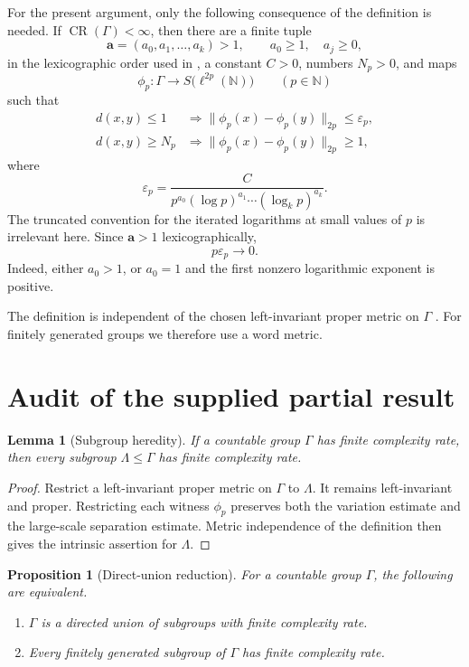 \documentclass[11pt]{article}
\newtheorem{proposition}[theorem]{Proposition}
\newtheorem{lemma}[theorem]{Lemma}
\newcommand{\CR}{\operatorname{CR}}
\newcommand{\N}{\mathbb N}
\newcommand{\eps}{\varepsilon}
\newcommand{\Sphere}{S}
\begin{document}
For the present argument, only the following consequence of the definition is needed.  If $\CR(\Gamma)<\infty$, then there are a finite tuple
\[
  \mathbf a=(a_0,a_1,\ldots,a_k)>1,
  \qquad a_0\ge 1,\quad a_j\ge 0,
\]
in the lexicographic order used in \cite{TianYu2026}, a constant $C>0$, numbers $N_p>0$, and maps
\[
  \phi_p:\Gamma\longrightarrow \Sphere\bigl(\ell^{2p}(\N)\bigr)
  \qquad (p\in\N)
\]
such that
\begin{align}
 d(x,y)\le 1
 &\Longrightarrow
 \|\phi_p(x)-\phi_p(y)\|_{2p}
 \le \eps_p,
 \label{eq:variation}\tag{1.1}\\
 d(x,y)\ge N_p
 &\Longrightarrow
 \|\phi_p(x)-\phi_p(y)\|_{2p}\ge 1,
 \label{eq:separation}\tag{1.2}
\end{align}
where
\[
 \eps_p=
 \frac{C}{p^{a_0}(\log p)^{a_1}\cdots(\log_k p)^{a_k}}.
\]
The truncated convention for the iterated logarithms at small values of $p$ is irrelevant here.  Since $\mathbf a>1$ lexicographically,
\begin{equation}
  p\eps_p\longrightarrow 0.
  \label{eq:pepszero}\tag{1.3}
\end{equation}
Indeed, either $a_0>1$, or $a_0=1$ and the first nonzero logarithmic exponent is positive.

The definition is independent of the chosen left-invariant proper metric on $\Gamma$ \cite{TianYu2026}.  For finitely generated groups we therefore use a word metric.

\section{Audit of the supplied partial result}

\begin{lemma}[Subgroup heredity]\label{lem:subgroup}
If a countable group $\Gamma$ has finite complexity rate, then every subgroup $\Lambda\leq \Gamma$ has finite complexity rate.
\end{lemma}

\begin{proof}
Restrict a left-invariant proper metric on $\Gamma$ to $\Lambda$.  It remains left-invariant and proper.  Restricting each witness $\phi_p$ preserves both the variation estimate and the large-scale separation estimate.  Metric independence of the definition then gives the intrinsic assertion for $\Lambda$.
\end{proof}

\begin{proposition}[Direct-union reduction]\label{prop:directunion}
For a countable group $\Gamma$, the following are equivalent.
\begin{enumerate}
  \item $\Gamma$ is a directed union of subgroups with finite complexity rate.
  \item Every finitely generated subgroup of $\Gamma$ has finite complexity rate.
\end{enumerate}
\end{proposition}
\end{document}
